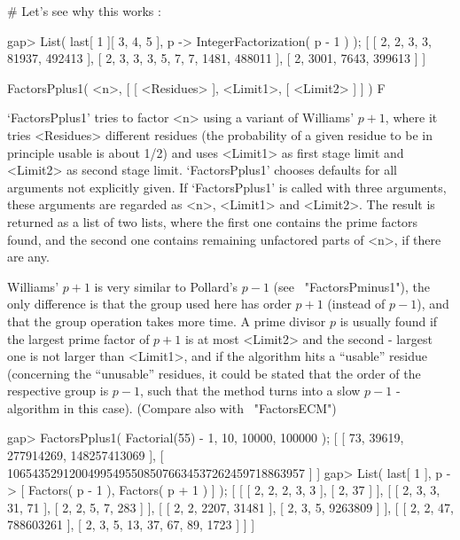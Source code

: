 # Let's see why this works :

gap> List( last[ 1 ]{[ 3, 4, 5 ]}, p -> IntegerFactorization( p - 1 ) );
[ [ 2, 2, 3, 3, 81937, 492413 ], [ 2, 3, 3, 3, 5, 7, 7, 1481, 488011 ], 
  [ 2, 3001, 7643, 399613 ] ]
\endexample


\>FactorsPplus1( <n>, [ [ <Residues> ], <Limit1>, [ <Limit2> ] ] ) F

`FactorsPplus1' tries to factor <n> using a variant of Williams' $p+1$, 
where it tries <Residues> different residues (the probability of a 
given residue to be in principle usable is about 1/2) and 
uses <Limit1> as first stage limit and <Limit2> as second stage
limit. `FactorsPplus1' chooses defaults for all arguments
not explicitly given.
If `FactorsPplus1' is called with three arguments, these arguments
are regarded as <n>, <Limit1> and <Limit2>.
The result is returned as a list of two lists, where the first one 
contains the prime factors found, and the second one contains
remaining unfactored parts of <n>, if there are any.

Williams' $p+1$ is very similar to Pollard's $p-1$ 
(see ~"FactorsPminus1"), the only difference is that the group 
used here has order $p+1$ (instead of $p-1$), and that the group
operation takes more time.
A prime divisor $p$ is usually found if the largest prime factor
of $p+1$ is at most <Limit2> and the second - largest one is not
larger than <Limit1>, and if the algorithm hits a ``usable''
residue (concerning the ``unusable'' residues, it could be stated
that the order of the respective group is $p-1$, such that
the method turns into a slow $p-1$ - algorithm in this case).
(Compare also with ~"FactorsECM")

\beginexample
gap> FactorsPplus1( Factorial(55) - 1, 10, 10000, 100000 );
[ [ 73, 39619, 277914269, 148257413069 ], 
  [ 106543529120049954955085076634537262459718863957 ] ]
gap> List( last[ 1 ], p -> [ Factors( p - 1 ), Factors( p + 1 ) ] );
[ [ [ 2, 2, 2, 3, 3 ], [ 2, 37 ] ], 
  [ [ 2, 3, 3, 31, 71 ], [ 2, 2, 5, 7, 283 ] ], 
  [ [ 2, 2, 2207, 31481 ], [ 2, 3, 5, 9263809 ] ], 
  [ [ 2, 2, 47, 788603261 ], [ 2, 3, 5, 13, 37, 67, 89, 1723 ] ] ]
\endexample



